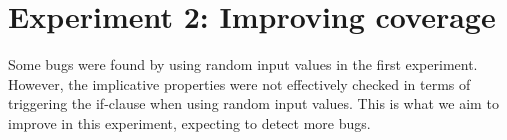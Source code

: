 \chapter{Experiment 2: Improving coverage}
\label{cpt:experiment2}
Some bugs were found by using random input values in the first experiment.
However, the implicative properties were not effectively checked in terms of
triggering the if-clause when using random input values. This is what we aim to
improve in this experiment, expecting to detect more bugs.

